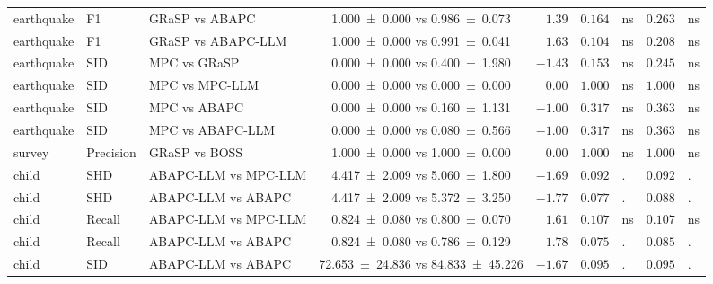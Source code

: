 \begin{table}[t]
{\begin{tabular}{ll l|c|r|rl|rl}
    earthquake & F1 & GRaSP vs ABAPC & \num{1.000 +- 0.000} vs \num{0.986 +- 0.073} & $1.39$ & $0.164$ & \!\!\!ns & $0.263$ & \!\!\!ns \\
    earthquake & F1 & GRaSP vs ABAPC-LLM & \num{1.000 +- 0.000} vs \num{0.991 +- 0.041} & $1.63$ & $0.104$ & \!\!\!ns & $0.208$ & \!\!\!ns \\
    earthquake & SID & MPC vs GRaSP & \num{0.000 +- 0.000} vs \num{0.400 +- 1.980} & $-1.43$ & $0.153$ & \!\!\!ns & $0.245$ & \!\!\!ns \\
    earthquake & SID & MPC vs MPC-LLM & \num{0.000 +- 0.000} vs \num{0.000 +- 0.000} & $0.00$ & $1.000$ & \!\!\!ns & $1.000$ & \!\!\!ns \\
    earthquake & SID & MPC vs ABAPC & \num{0.000 +- 0.000} vs \num{0.160 +- 1.131} & $-1.00$ & $0.317$ & \!\!\!ns & $0.363$ & \!\!\!ns \\
    earthquake & SID & MPC vs ABAPC-LLM & \num{0.000 +- 0.000} vs \num{0.080 +- 0.566} & $-1.00$ & $0.317$ & \!\!\!ns & $0.363$ & \!\!\!ns \\
    \midrule
    survey & Precision & GRaSP vs BOSS & \num{1.000 +- 0.000} vs \num{1.000 +- 0.000} & $0.00$ & $1.000$ & \!\!\!ns & $1.000$ & \!\!\!ns \\
    \midrule
    child & SHD & ABAPC-LLM vs MPC-LLM & \num{4.417 +- 2.009} vs \num{5.060 +- 1.800} & $-1.69$ & $0.092$ & \!\!\!. & $0.092$ & \!\!\!. \\
    child & SHD & ABAPC-LLM vs ABAPC & \num{4.417 +- 2.009} vs \num{5.372 +- 3.250} & $-1.77$ & $0.077$ & \!\!\!. & $0.088$ & \!\!\!. \\
    child & Recall & ABAPC-LLM vs MPC-LLM & \num{0.824 +- 0.080} vs \num{0.800 +- 0.070} & $1.61$ & $0.107$ & \!\!\!ns & $0.107$ & \!\!\!ns \\
    child & Recall & ABAPC-LLM vs ABAPC & \num{0.824 +- 0.080} vs \num{0.786 +- 0.129} & $1.78$ & $0.075$ & \!\!\!. & $0.085$ & \!\!\!. \\
    child & SID & ABAPC-LLM vs ABAPC & \num{72.653 +- 24.836} vs \num{84.833 +- 45.226} & $-1.67$ & $0.095$ & \!\!\!. & $0.095$ & \!\!\!. \\
    \bottomrule
    \end{tabular}
    }
\end{table}

